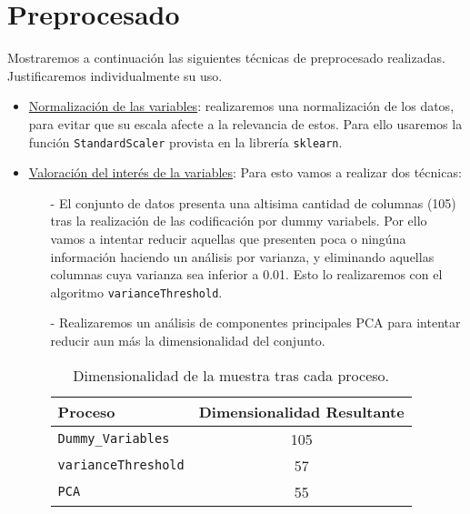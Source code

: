 \documentclass[11pt,a4paper]{article}
\begin{document}
\section{Preprocesado}

Mostraremos a continuación las siguientes técnicas de preprocesado realizadas. Justificaremos individualmente su uso.

\begin{itemize}

	\item \underline{Normalización de las variables}: realizaremos una normalización de los datos, para evitar que su escala afecte a la relevancia de estos. Para ello usaremos la función \texttt{StandardScaler}\cite{standardscaler} provista en la librería \texttt{sklearn}.
		\item \underline{Valoración del interés de la variables}: Para esto vamos a realizar dos técnicas:
	
	\begin{itemize}
	\item[-] El conjunto de datos presenta una altisima cantidad de columnas (105) tras la realización de las codificación por dummy variabels. Por ello vamos a intentar reducir aquellas que presenten poca o ningúna información haciendo un análisis por varianza, y eliminando aquellas columnas cuya varianza sea inferior a 0.01. Esto lo realizaremos con el algoritmo  \texttt{varianceThreshold}\cite{einstein}.
	
	\item[-] Realizaremos un análisis de componentes principales PCA\cite{PCA} para intentar reducir aun más la dimensionalidad del conjunto. 


		
\begin{table}[h]
\begin{center}
\begin{tabular}{|l|c|}
\hline
 Proceso & Dimensionalidad Resultante \\ \hline
 \texttt{Dummy\_Variables} &  105\\
\texttt{varianceThreshold} &57 \\
\texttt{PCA} & 55 \\\hline
\end{tabular}
\end{center}
\caption{Dimensionalidad de la muestra tras cada proceso.}
	\end{table}

\end{itemize}


\end{itemize}
\end{document}
